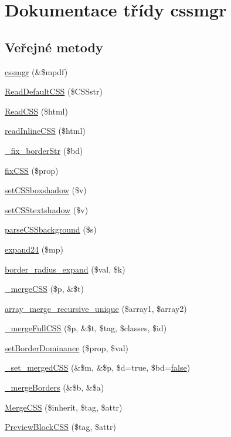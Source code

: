 \hypertarget{classcssmgr}{\section{Dokumentace třídy cssmgr}
\label{classcssmgr}
}
\subsection*{Veřejné metody}
\begin{DoxyCompactItemize}
\item 
\hyperlink{classcssmgr_ae97cffe739568879d73e48b62363a6c2}{cssmgr} (\&\$mpdf)
\item 
\hyperlink{classcssmgr_a51ff1a73ef34ac58a3db620b4c2332ae}{Read\-Default\-C\-S\-S} (\$C\-S\-Sstr)
\item 
\hyperlink{classcssmgr_a10200abacc96585824d274a01524fd1a}{Read\-C\-S\-S} (\$html)
\item 
\hyperlink{classcssmgr_a61f75310c1938a3f2216cc615dd8555d}{read\-Inline\-C\-S\-S} (\$html)
\item 
\hyperlink{classcssmgr_aaa4827d69464f72b7ef6a10e13bd5503}{\-\_\-fix\-\_\-border\-Str} (\$bd)
\item 
\hyperlink{classcssmgr_ada3f5ed246794b62a0babe035f7247ac}{fix\-C\-S\-S} (\$prop)
\item 
\hyperlink{classcssmgr_ab216eeec59aaa3180f7f613ba8dc6354}{set\-C\-S\-Sboxshadow} (\$v)
\item 
\hyperlink{classcssmgr_a519eea9be0cd0325bce9508eaf8b2a1b}{set\-C\-S\-Stextshadow} (\$v)
\item 
\hyperlink{classcssmgr_a94927ac1ef8461cf0796679fc6748b29}{parse\-C\-S\-Sbackground} (\$s)
\item 
\hyperlink{classcssmgr_a38c5337908b43319819499ca13e74d98}{expand24} (\$mp)
\item 
\hyperlink{classcssmgr_add5b59db1ca9b700127f430f04f63996}{border\-\_\-radius\-\_\-expand} (\$val, \$k)
\item 
\hyperlink{classcssmgr_ad818d1bf420f9a0466d4b1dbbb6a708f}{\-\_\-merge\-C\-S\-S} (\$p, \&\$t)
\item 
\hyperlink{classcssmgr_a678905be381aa19caa70c275f5e18884}{array\-\_\-merge\-\_\-recursive\-\_\-unique} (\$array1, \$array2)
\item 
\hyperlink{classcssmgr_a4409a7b66a0df39d16eb8a0f75d0e2ce}{\-\_\-merge\-Full\-C\-S\-S} (\$p, \&\$t, \$tag, \$classes, \$id)
\item 
\hyperlink{classcssmgr_a94c063a1046af4233dcd39968609d3d9}{set\-Border\-Dominance} (\$prop, \$val)
\item 
\hyperlink{classcssmgr_a5759f792776d8f7ca0deb7a0fcdc8bf1}{\-\_\-set\-\_\-merged\-C\-S\-S} (\&\$m, \&\$p, \$d=true, \$bd=\hyperlink{ttfontsuni_8php_afbaa04e5cc97693dc668b3c45d3dd740}{false})
\item 
\hyperlink{classcssmgr_a9c9f283479cf56ba17285f5a200840a3}{\-\_\-merge\-Borders} (\&\$b, \&\$a)
\item 
\hyperlink{classcssmgr_a419272022a54aed8a45bff117fa2ac2e}{Merge\-C\-S\-S} (\$inherit, \$tag, \$attr)
\item 
\hyperlink{classcssmgr_ad7fe04c0be578116c5e64465da675fd4}{Preview\-Block\-C\-S\-S} (\$tag, \$attr)
\end{DoxyCompactItemize}
